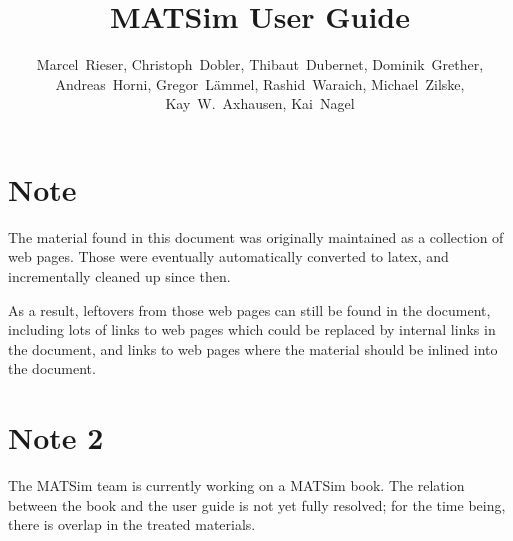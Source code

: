 \documentclass[a4paper,11pt]{report}
\newcommand{\NextFile}[1]{}
\def\umbruch{\vfill\eject}
\def\umbruch{\relax}
\begin{document}
\NextFile{index.html}

\title{MATSim User Guide}

\author{%
Marcel~Rieser, %
%
Christoph~Dobler,
Thibaut~Dubernet,
Dominik~Grether,
Andreas~Horni, 
Gregor~Lämmel,
Rashid~Waraich,
Michael~Zilske,
%
Kay~W.~Axhausen, %
Kai~Nagel %
}



\umbruch

\section*{Note}

The material found in this document was originally maintained as a collection of web pages.  Those were eventually automatically converted to latex, and incrementally cleaned up since then.  

As a result, leftovers from those web pages can still be found in the document, including lots of links to web pages which could be replaced by internal links in the document, and links to web pages where the material should be inlined into the document.




\section*{Note 2}

The MATSim team is currently working on a MATSim book.  The relation between the book and the user guide is not yet fully resolved; for the time being, there is overlap in the treated materials.




\umbruch

\tableofcontents













%
\end{document}
